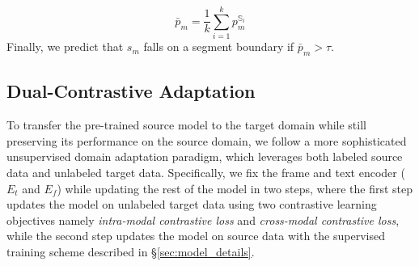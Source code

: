 \documentclass[runningheads]{llncs}
\begin{document}
\vspace{-3 mm}
\begin{equation}
    \bar{p}_m =  \frac{1}{k}\sum_{i=1}^k p_m^{\mathbb{S}_{i}} \label{eq:3}
\end{equation}
Finally, we predict that $s_m$ falls on a segment boundary if $\bar{p}_m > \tau$.

\vspace{-2ex}
\subsection{Dual-Contrastive Adaptation}
\label{sec:dual_contrast}
To transfer the pre-trained source model to the target domain while still preserving its performance on the source domain, 
we follow a more sophisticated unsupervised domain adaptation paradigm, which leverages both labeled source data and unlabeled target data. %
Specifically, we fix the frame and text encoder ($E_t$ and $E_f$) %
while updating the rest of the model in two steps, where the first step updates the model on unlabeled target data using two contrastive learning objectives namely \textit{intra-modal contrastive loss} and \textit{cross-modal contrastive loss}, while the second step updates the model on source data with the supervised training scheme described in \S\ref{sec:model_details}.
 
\end{document}
